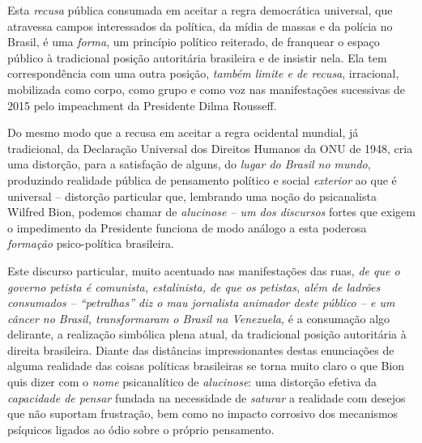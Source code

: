 Esta \emph{recusa} pública consumada em aceitar a regra democrática
universal, que atravessa campos interessados da política, da mídia de
massas e da polícia no Brasil, é uma \emph{forma}, um princípio político
reiterado, de franquear o espaço público à tradicional posição
autoritária brasileira e de insistir nela. Ela tem correspondência com
uma outra posição, \emph{também limite e de recusa}, irracional,
mobilizada como corpo, como grupo e como voz nas manifestações
sucessivas de 2015 pelo impeachment da Presidente Dilma Rousseff.

Do mesmo modo que a recusa em aceitar a regra ocidental mundial, já
tradicional, da Declaração Universal dos Direitos Humanos da ONU de
1948, cria uma distorção, para a satisfação de alguns, do \emph{lugar do
Brasil no mundo}, produzindo realidade pública de pensamento político e
social \emph{exterior} ao que é universal -- distorção particular que,
lembrando uma noção do psicanalista Wilfred Bion, podemos chamar de
\emph{alucinose -- um dos discursos} fortes que exigem o impedimento da
Presidente funciona de modo análogo a esta poderosa \emph{formação}
psico-política brasileira.

Este discurso particular, muito acentuado nas manifestações das ruas,
\emph{de que o governo petista é comunista, estalinista, de que os
petistas, além de ladrões consumados -- ``petralhas'' diz o mau
jornalista animador deste público -- e um câncer no Brasil,
transformaram o Brasil na Venezuela,} é a consumação algo delirante, a
realização simbólica plena atual, da tradicional posição autoritária à
direita brasileira. Diante das distâncias impressionantes destas
enunciações de alguma realidade das coisas políticas brasileiras se
torna muito claro o que Bion quis dizer com o \emph{nome} psicanalítico
de \emph{alucinose}: uma distorção efetiva da \emph{capacidade de
pensar} fundada na necessidade de \emph{saturar} a realidade com desejos
que não suportam frustração, bem como no impacto corrosivo dos
mecanismos psíquicos ligados ao ódio sobre o próprio pensamento.

